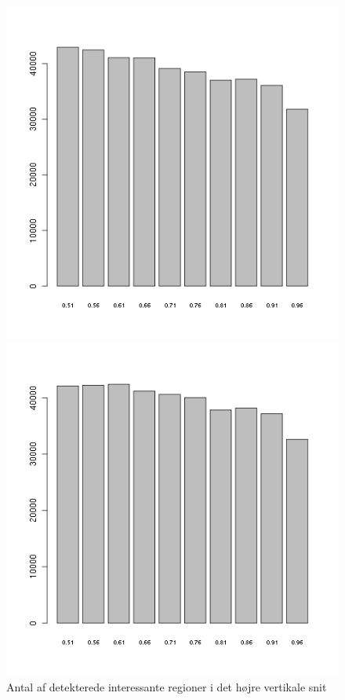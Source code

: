 {%
\begin{figure}[ht]
	\begin{minipage}[b]{0.5\linewidth}
		\begin{center}
		\includegraphics[scale=0.4]{afsnit/resultater/billeder/cut0featsperratio.png}
		\caption{Antal af detekterede interessante regioner i det højre
		vertikale snit}
		\label{cut0feats}
		\end{center}
	\end{minipage}
	\hspace{0.5cm}
	\begin{minipage}[b]{0.5\linewidth}
		\begin{center}
		\includegraphics[scale=0.4]{afsnit/resultater/billeder/cut1featsperratio.png}

\end{center}
\end{minipage}
\end{figure}}
